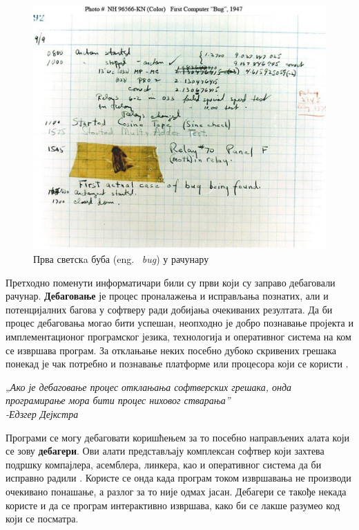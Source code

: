 \documentclass[a4paper]{article}
\begin{document}
\begin{figure}
    \begin{center}
        \includegraphics[scale = 0.25]{slike/prvi_bag.jpg}
    \end{center}
    \caption{Прва светскa буба (eng. ~{\em bug}) у рачунару}
    \label{fig:bug}
\end{figure}

Претходно поменути информатичари били су први који су заправо 
дебаговали рачунар. \textbf{Дебаговање} је процес проналажења и исправљања
познатих, али и потенцијалних багова у софтверу ради добијања
очекиваних резултата. Да би процес дебаговања могао бити успешан, неопходно
је добро познавање пројекта и имплементационог програмског језика,
технологија и оперативног система на ком се извршава 
програм. За отклањање неких посебно дубоко скривених грешака понекад 
је чак потребно и познавање платформе или процесора који се користи \cite{debuggingApplications}.

\break

\textit{„Ако је дебаговање процес отклањања софтверских грешака, онда
програмирање мора бити процес ниховог стварања”\\
\hspace*{0pt}\hfill-Едзгер Дејкстра}

Програми се могу дебаговати коришћењем за то посебно направљених
алата који се зову \textbf{дебагери}. Ови алати представљају комплексан
софтвер који захтева подршку компајлера, асемблера, линкера, као и оперативног
система да би исправно радили \cite{debuggersForProgrammingLanguages}.
Користе се онда када програм током извршавања не производи очекивано
понашање, а разлог за то није одмах јасан. Дебагери се
такође некада користе и да се програм интерактивно извршава,
како би се лакше разумео код који се посматра.
\end{document}
